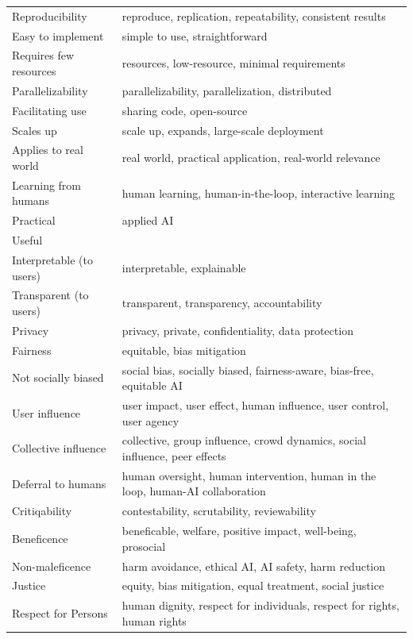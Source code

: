 \documentclass{article}
\begin{document}
\begin{longtable}{|p{5cm}|p{10cm}|}
    Reproducibility & reproduce, replication, repeatability, consistent results \\ 
    Easy to implement & simple to use, straightforward \\ 
    Requires few resources & resources, low-resource, minimal requirements \\ 
    Parallelizability & parallelizability, parallelization, distributed \\ 
    Facilitating use & sharing code, open-source \\ 
    Scales up & scale up, expands, large-scale deployment \\ 
    Applies to real world & real world, practical application, real-world relevance \\ 
    Learning from humans & human learning, human-in-the-loop, interactive learning \\ 
    Practical & applied AI \\ 
    Useful & \\ 
    Interpretable (to users) & interpretable, explainable \\ 
    Transparent (to users) & transparent, transparency, accountability \\ 
    Privacy & privacy, private, confidentiality, data protection \\ 
    Fairness & equitable, bias mitigation \\ 
    Not socially biased & social bias, socially biased, fairness-aware, bias-free, equitable AI \\ 
    User influence & user impact, user effect, human influence, user control, user agency \\ 
    Collective influence & collective, group influence, crowd dynamics, social influence, peer effects \\ 
    Deferral to humans & human oversight, human intervention, human in the loop, human-AI collaboration \\ 
    Critiqability & contestability, scrutability, reviewability \\ 
    Beneficence & beneficable, welfare, positive impact, well-being, prosocial \\ 
    Non-maleficence & harm avoidance, ethical AI, AI safety, harm reduction \\ 
    Justice & equity, bias mitigation, equal treatment, social justice \\ 
    Respect for Persons & human dignity, respect for individuals, respect for rights, human rights \\ 

\end{longtable}
\end{document}
